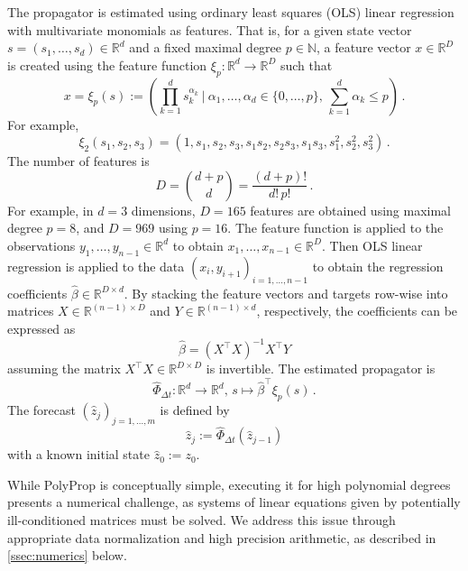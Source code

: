 \documentclass{article}
\newcommand{\N}{\mathbb{N}}
\newcommand{\R}{\mathbb{R}}
\newcommand{\lb}{\left(} %
\newcommand{\rb}{\right)} %
\newcommand{\br}[1]{\lb #1 \rb} %
\newcommand{\tr}{^{\!\top}\!} %
\newcommand{\eqfs}{\,.}
\newcommand{\stepsize}{\Delta\!t}
\begin{document}
The propagator is estimated using ordinary least squares (OLS) linear regression with multivariate monomials as features. That is, for a given state vector $s = (s_1, \dots, s_d) \in \R^d$ and a fixed maximal degree $p\in\N$, a feature vector $x \in\R^D$ is created using the feature function $\xi_p\colon\R^d\to\R^D$ such that
\begin{equation}
    x = \xi_p(s) := \br{\prod_{k=1}^ds_k^{\alpha_k} \ \Bigg\vert\ \alpha_1, \dots, \alpha_d\in \{0, \dots, p\},\, \sum_{k=1}^d\alpha_k \leq p}
    \eqfs
\end{equation}
For example, 
\begin{equation}
    \xi_2(s_1, s_2, s_3) = \br{1, s_1, s_2, s_3, s_1s_2, s_2s_3, s_1s_3, s_1^2, s_2^2, s_3^2}
    \eqfs
\end{equation}
The number of features is 
\begin{equation}
    D = 
    \binom{d+p}{d} = 
    \frac{(d+p)!}{d!\,p!}
    \eqfs
\end{equation}
For example, in $d=3$ dimensions, $D = 165$ features are obtained using maximal degree $p = 8$, and $D = 969$ using $p = 16$.
The feature function is applied to the observations $y_1, \dots, y_{n-1} \in \R^d$ to obtain $x_1, \dots, x_{n-1} \in\R^D$. Then OLS linear regression is applied to the data $(x_i, y_{i+1})_{i=1,\dots, n-1}$ to obtain the regression coefficients $\hat\beta\in\R^{D\times d}$. 
By stacking the feature vectors and targets row-wise into matrices $X \in\R^{(n-1)\times D}$ and $Y \in\R^{(n-1)\times d}$, respectively, the coefficients can be expressed as 
\begin{equation}\label{eq:beta}
    \hat\beta = (X\tr X)^{-1}X\tr Y
\end{equation}
assuming the matrix $X\tr X \in \R^{D\times D}$ is invertible. The estimated propagator is 
\begin{equation}
    \hat\Phi_{\stepsize} \colon \R^d \to \R^d,\, s\mapsto \hat \beta\tr\xi_p(s) 
    \eqfs
\end{equation}
The forecast $(\hat z_j)_{j=1, \dots, m}$ is defined by
\begin{equation}
    \hat z_{j} := \hat\Phi_{\stepsize}(\hat z_{j-1})
\end{equation}
with a known initial state $\hat z_{0} := z_0$.

While PolyProp is conceptually simple, executing it for high polynomial degrees presents a numerical challenge, as systems of linear equations given by potentially ill-conditioned matrices must be solved. We address this issue through appropriate data normalization and high precision arithmetic, as described in \cref{ssec:numerics} below.
\end{document}
